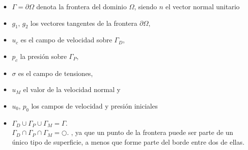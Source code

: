 \documentclass[spanish]{beamer}
\begin{document}
%
\begin{frame}
\begin{itemize} 
\item $\Gamma = \partial \Omega$ denota la frontera del dominio $\Omega$, siendo $n$ el vector normal unitario 
\item $g_1$, $g_2$ los vectores tangentes de la frontera $\partial \Omega$,
\item $u_c$ es el campo de velocidad sobre $\Gamma_D$,
\item $p_c$ la presión sobre $\Gamma_P$,
\item $\sigma$ es el campo de tensiones,
\item $u_M$ el valor de la velocidad normal y 
\item $u_0$, $p_0$ los campos de velocidad y presión iniciales
\item {$\Gamma_D \cup \Gamma_P \cup \Gamma_M=\Gamma$.\\ 
$\Gamma_D \cap \Gamma_P \cap \Gamma_M=\bigcirc$. , ya que un punto de la frontera puede ser parte de un único tipo de superficie, a menos que forme parte del borde entre dos de ellas.}
\end{itemize}
\end{frame}
%
\end{document}
